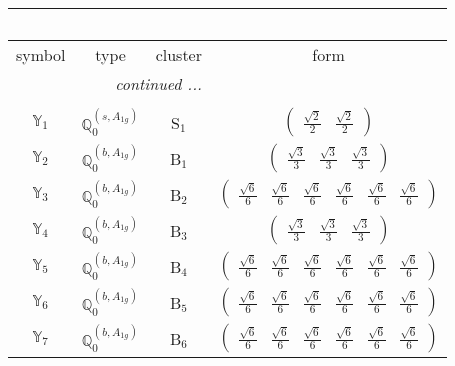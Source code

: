 \documentclass[fleqn,10pt,landscape]{article}
\begin{document}
\begin{itemize}
\begin{center}
\begin{longtable}{c|c|c|c}
\multicolumn{3}{l}{\tablename\ \thetable{}} \\
 \hline \hline
symbol & type & cluster & form \\ \hline \endhead

 \hline \hline
\multicolumn{3}{r}{\footnotesize\it continued ...} \\ \endfoot

 \hline \hline
\multicolumn{3}{r}{} \\ \endlastfoot

$ \mathbb{Y}_{1} $ & $\mathbb{Q}_{0}^{(s,A_{1g})}$ & S$_{1}$ & $\begin{pmatrix} \frac{\sqrt{2}}{2} & \frac{\sqrt{2}}{2} \end{pmatrix}$ \\ \hline
$ \mathbb{Y}_{2} $ & $\mathbb{Q}_{0}^{(b,A_{1g})}$ & B$_{1}$ & $\begin{pmatrix} \frac{\sqrt{3}}{3} & \frac{\sqrt{3}}{3} & \frac{\sqrt{3}}{3} \end{pmatrix}$ \\ \hline
$ \mathbb{Y}_{3} $ & $\mathbb{Q}_{0}^{(b,A_{1g})}$ & B$_{2}$ & $\begin{pmatrix} \frac{\sqrt{6}}{6} & \frac{\sqrt{6}}{6} & \frac{\sqrt{6}}{6} & \frac{\sqrt{6}}{6} & \frac{\sqrt{6}}{6} & \frac{\sqrt{6}}{6} \end{pmatrix}$ \\ \hline
$ \mathbb{Y}_{4} $ & $\mathbb{Q}_{0}^{(b,A_{1g})}$ & B$_{3}$ & $\begin{pmatrix} \frac{\sqrt{3}}{3} & \frac{\sqrt{3}}{3} & \frac{\sqrt{3}}{3} \end{pmatrix}$ \\ \hline
$ \mathbb{Y}_{5} $ & $\mathbb{Q}_{0}^{(b,A_{1g})}$ & B$_{4}$ & $\begin{pmatrix} \frac{\sqrt{6}}{6} & \frac{\sqrt{6}}{6} & \frac{\sqrt{6}}{6} & \frac{\sqrt{6}}{6} & \frac{\sqrt{6}}{6} & \frac{\sqrt{6}}{6} \end{pmatrix}$ \\ \hline
$ \mathbb{Y}_{6} $ & $\mathbb{Q}_{0}^{(b,A_{1g})}$ & B$_{5}$ & $\begin{pmatrix} \frac{\sqrt{6}}{6} & \frac{\sqrt{6}}{6} & \frac{\sqrt{6}}{6} & \frac{\sqrt{6}}{6} & \frac{\sqrt{6}}{6} & \frac{\sqrt{6}}{6} \end{pmatrix}$ \\ \hline
$ \mathbb{Y}_{7} $ & $\mathbb{Q}_{0}^{(b,A_{1g})}$ & B$_{6}$ & $\begin{pmatrix} \frac{\sqrt{6}}{6} & \frac{\sqrt{6}}{6} & \frac{\sqrt{6}}{6} & \frac{\sqrt{6}}{6} & \frac{\sqrt{6}}{6} & \frac{\sqrt{6}}{6} \end{pmatrix}$ \\
\end{longtable}
\end{center}


\end{itemize}
\end{document}
